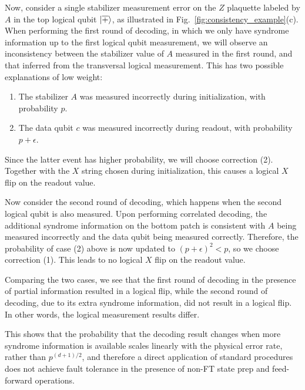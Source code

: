 Now, consider a single stabilizer measurement error on the $Z$ plaquette labeled by $A$ in the top logical qubit $|{\overline{+}}\rangle$, as illustrated in Fig.~\ref{fig:consistency_example}(c).
%
When performing the first round of decoding, in which we only have syndrome information up to the first logical qubit measurement, we will observe an inconsistency between the stabilizer value of $A$ measured in the first round, and that inferred from the transversal logical measurement.
%
This has two possible explanations of low weight:
\begin{enumerate}
\item The stabilizer $A$ was measured incorrectly during initialization, with probability $p$.
\item The data qubit $c$ was measured incorrectly during readout, with probability $p+\epsilon$.
\end{enumerate}

Since the latter event has higher probability, we will choose correction (2). Together with the $X$ string chosen during initialization, this causes a logical $X$ flip on the readout value.

Now consider the second round of decoding, which happens when the second logical qubit is also measured. Upon performing correlated decoding, the additional syndrome information on the bottom patch is consistent with $A$ being measured incorrectly and the data qubit being measured correctly. Therefore, the probability of case (2) above is now updated to $(p+\epsilon)^2<p$, so we choose correction (1). This leads to no logical $X$ flip on the readout value.

Comparing the two cases, we see that the first round of decoding in the presence of partial information resulted in a logical flip, while the second round of decoding, due to its extra syndrome information, did not result in a logical flip. In other words, the logical measurement results differ.

This shows that the probability that the decoding result changes when more syndrome information is available scales linearly with the physical error rate, rather than $p^{(d+1)/2}$, and therefore a direct application of standard procedures does not achieve fault tolerance in the presence of non-FT state prep and feed-forward operations.


